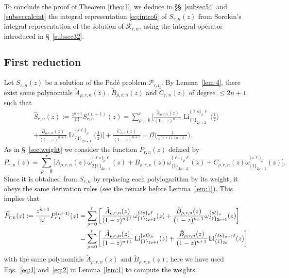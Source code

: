 \documentclass[reqno,12pt]{amsart}
\numberwithin{equation}{section}
\theoremstyle{remark}
\def\om{\omega}
\def\li{\operatorname{Li}}
\newcommand{\Prn}{\mathcal{P}_{r,n}}
\newcommand{\soro}{\mathcal{R}_{r,n}}
\begin{document}
To conclude the proof of Theorem \ref{theo:1}, we deduce in \S\S~\ref{subsec54} and \ref{subseccalcint} the integral
 representation \eqref{eq:intro6} of $S_{r,n}(z)$ from Sorokin's  integral
 representation of the solution of $\soro$, using the integral operator introduced in \S~\ref{subsec32}.

\subsection{First reduction} \label{subsecfirstred}


Let $S_{r,n}(z)$ be a solution  of the Pad\'e problem $\Prn$. 
By Lemma~\ref{lem:4}, there exist some polynomials $\check{A}_{\rho,r,n}(z)$,  $\check{B}_{\rho,r,n}(z)$ 
and  $\check{C}_{r,n}(z)$ of degree $\le 2n+1$ such that
\begin{multline}
\widehat{S}_{r,n}(z):=\frac{z^{n+1}}{n!}S^{(n+1)}_{r,n}(z) 
= \sum_{\rho=0}^r \bigg[\frac{\check{A}_{\rho,r,n}(z)}{(1-z)^{n+1}} \li_{\{1\}_{2\rho+2}}^{\{\ell s\}_\rho \ell}\bigg(\frac1z\bigg) 
\\
+\frac{\check{B}_{\rho,r,n}(z)}{(1-z)^{n+1}} \li_{\{1\}_{2\rho+1}}^{\{s\ell\}_\rho}\bigg(\frac1z\bigg)  \bigg] 
+ \frac{\check{C}_{r,n}(z)}{(1-z)^{n+1}} = \mathcal{O}\bigg(\frac{1}{z^{(r+1)(n+1)}}\bigg).\label{eq:66}
\end{multline}
As in \S~\ref{sec:weight} we consider the function $P_{r,n}(z)$ defined by 
$$
P_{r,n}(z) = \sum_{\rho=0}^r \bigg[ A_{\rho,r,n}(z) \om_{2\{1\}_{2\rho+1}}^{\{\ell s\}_\rho\ell}(z) 
+ B_{\rho,r,n}(z) \om_{\{1\}_{2\rho+2}}^{\{\ell s\}_\rho\ell}(z)+C_{\rho,r,n}(z)
\om_{\{1\}_{2\rho+1}}^{\{s\ell\}_\rho}(z)\bigg].
$$
Since it is obtained from $S_{r,n}$ by replacing each polylogarithm by its weight, 
  it  obeys the same derivation rules (see the remark before Lemma \ref{lem:1}). This implies that  
\begin{align}
\widehat{P}_{r,n}(z):=\frac{z^{n+1}}{n!}P^{(n+1)}_{r,n}(z) 
&= \sum_{\rho=0}^r \bigg[\frac{\check{A}_{\rho,r,n}(z)}{(1-z)^{n+1}} \om_{\{1\}_{2\rho+2}}^{\{\ell s\}_\rho \ell}(z) 
+\frac{\check{B}_{\rho,r,n}(z)}{(1-z)^{n+1}} \om_{\{1\}_{2\rho+1}}^{\{s\ell\}_\rho}(z)  \bigg] \notag
\\
&=\sum_{\rho=0}^r \bigg[\frac{\check{A}_{\rho,r,n}(z)}{(1-z)^{n+1}} \li_{\{1\}_{2\rho+1}}^{\{s\ell\}_\rho}(z) 
+\frac{\check{B}_{\rho,r,n}(z)}{(1-z)^{n+1}} \li_{\{1\}_{2\rho}}^{\{\ell s\}_{\rho-1}\ell}(z)  \bigg] \label{eq:5}
\end{align}
with the same polynomials $\check{A}_{\rho,r,n}(z)$ and $\check{B}_{\rho,r,n}(z)$; here we have used Eqs.~\eqref{eq:1} 
and~\eqref{eq:2} in Lemma~\ref{lem:1} to compute the weights. 
\end{document}
